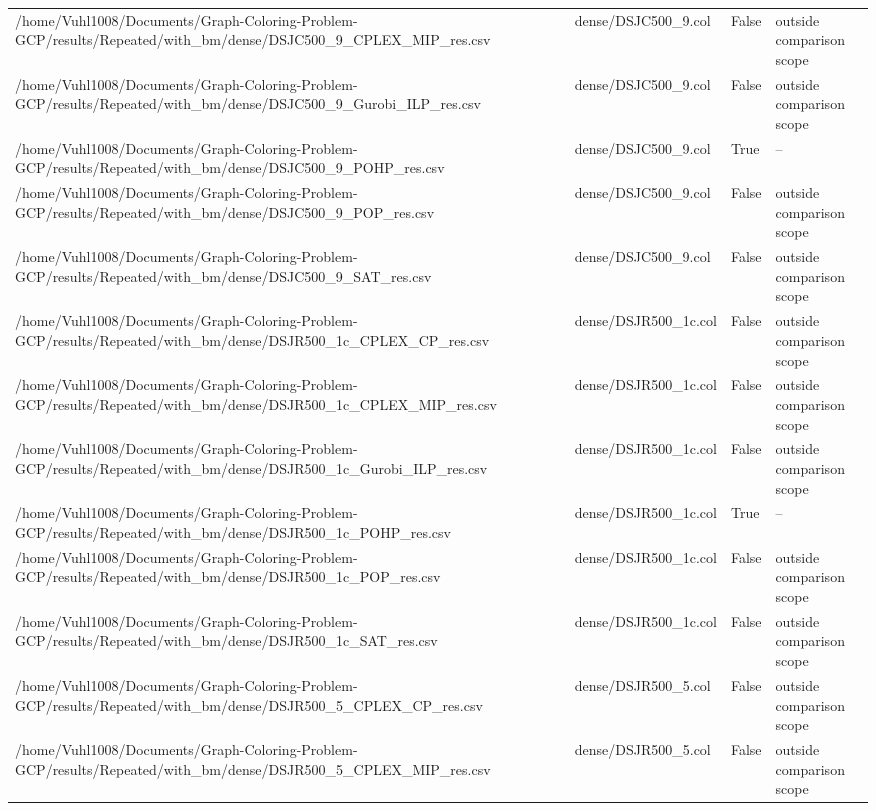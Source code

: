 \begin{table}[htbp]
\begin{tabular}{llll}
/home/Vuhl1008/Documents/Graph-Coloring-Problem-GCP/results/Repeated/with\_bm/dense/DSJC500\_9\_CPLEX\_MIP\_res.csv & dense/DSJC500\_9.col & False & outside comparison scope \\
/home/Vuhl1008/Documents/Graph-Coloring-Problem-GCP/results/Repeated/with\_bm/dense/DSJC500\_9\_Gurobi\_ILP\_res.csv & dense/DSJC500\_9.col & False & outside comparison scope \\
/home/Vuhl1008/Documents/Graph-Coloring-Problem-GCP/results/Repeated/with\_bm/dense/DSJC500\_9\_POHP\_res.csv & dense/DSJC500\_9.col & True & -- \\
/home/Vuhl1008/Documents/Graph-Coloring-Problem-GCP/results/Repeated/with\_bm/dense/DSJC500\_9\_POP\_res.csv & dense/DSJC500\_9.col & False & outside comparison scope \\
/home/Vuhl1008/Documents/Graph-Coloring-Problem-GCP/results/Repeated/with\_bm/dense/DSJC500\_9\_SAT\_res.csv & dense/DSJC500\_9.col & False & outside comparison scope \\
/home/Vuhl1008/Documents/Graph-Coloring-Problem-GCP/results/Repeated/with\_bm/dense/DSJR500\_1c\_CPLEX\_CP\_res.csv & dense/DSJR500\_1c.col & False & outside comparison scope \\
/home/Vuhl1008/Documents/Graph-Coloring-Problem-GCP/results/Repeated/with\_bm/dense/DSJR500\_1c\_CPLEX\_MIP\_res.csv & dense/DSJR500\_1c.col & False & outside comparison scope \\
/home/Vuhl1008/Documents/Graph-Coloring-Problem-GCP/results/Repeated/with\_bm/dense/DSJR500\_1c\_Gurobi\_ILP\_res.csv & dense/DSJR500\_1c.col & False & outside comparison scope \\
/home/Vuhl1008/Documents/Graph-Coloring-Problem-GCP/results/Repeated/with\_bm/dense/DSJR500\_1c\_POHP\_res.csv & dense/DSJR500\_1c.col & True & -- \\
/home/Vuhl1008/Documents/Graph-Coloring-Problem-GCP/results/Repeated/with\_bm/dense/DSJR500\_1c\_POP\_res.csv & dense/DSJR500\_1c.col & False & outside comparison scope \\
/home/Vuhl1008/Documents/Graph-Coloring-Problem-GCP/results/Repeated/with\_bm/dense/DSJR500\_1c\_SAT\_res.csv & dense/DSJR500\_1c.col & False & outside comparison scope \\
/home/Vuhl1008/Documents/Graph-Coloring-Problem-GCP/results/Repeated/with\_bm/dense/DSJR500\_5\_CPLEX\_CP\_res.csv & dense/DSJR500\_5.col & False & outside comparison scope \\
/home/Vuhl1008/Documents/Graph-Coloring-Problem-GCP/results/Repeated/with\_bm/dense/DSJR500\_5\_CPLEX\_MIP\_res.csv & dense/DSJR500\_5.col & False & outside comparison scope \\

\end{tabular}
\end{table}

